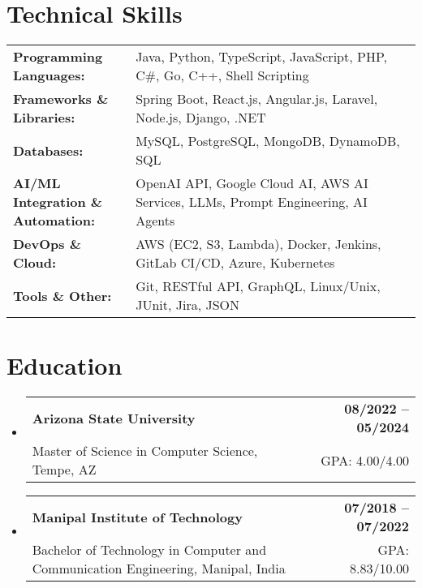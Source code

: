 \documentclass[letterpaper,11pt]{article}
\makeatletter
\newcommand{\educationSubheading}[4]{
  \vspace{-2pt}\item
    \begin{tabular*}{1.0\textwidth}[t]{l@{\extracolsep{\fill}}r}
      \textbf{\small #1} & \textbf{\small #2} \\
      {\small#3} & {\small #4} \\
    \end{tabular*}\vspace{-7pt}
}
\newcommand{\resumeSubHeadingListStart}{\begin{itemize}[leftmargin=0pt, label={}]}
\newcommand{\resumeSubHeadingListEnd}{\end{itemize}}
\makeatother
\begin{document}
\section{Technical Skills}
        \vspace{-14pt}
        \begin{table}[h]
            \footnotesize
            \begin{tabular}{p{0.3\linewidth} p{0.7\linewidth}}
                \textbf{Programming Languages:} & Java, Python, TypeScript, JavaScript, PHP, C\#, Go, C++, Shell Scripting \\
                \textbf{Frameworks \& Libraries:} & Spring Boot, React.js, Angular.js, Laravel, Node.js, Django, .NET \\
                \textbf{Databases:} & MySQL, PostgreSQL, MongoDB, DynamoDB, SQL \\
                \textbf{AI/ML Integration \& Automation:} & OpenAI API, Google Cloud AI, AWS AI Services, LLMs, Prompt Engineering, AI Agents \\
                \textbf{DevOps \& Cloud:} & AWS (EC2, S3, Lambda), Docker, Jenkins, GitLab CI/CD, Azure, Kubernetes \\
                \textbf{Tools \& Other:} & Git, RESTful API, GraphQL, Linux/Unix, JUnit, Jira, JSON \\
            \end{tabular}
        \end{table}

 \vspace{-15pt}

\section{Education}
  \resumeSubHeadingListStart
    \educationSubheading
      {Arizona State University}{08/2022 -- 05/2024}
      {Master of Science in Computer Science, Tempe, AZ}{GPA: 4.00/4.00}

    \educationSubheading
      {Manipal Institute of Technology}{07/2018 -- 07/2022}
      {Bachelor of Technology in Computer and Communication Engineering, Manipal, India}{GPA: 8.83/10.00}
  \resumeSubHeadingListEnd
\end{document}

